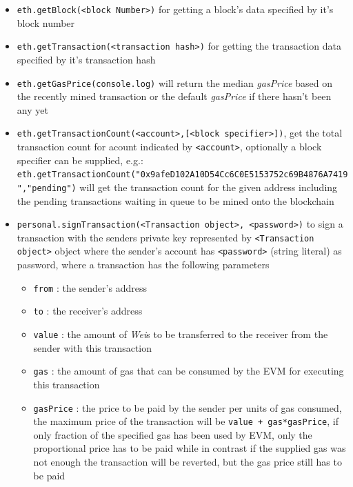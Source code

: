 \documentclass[a4paper]{article}
\begin{document}
\begin{itemize}
\item \verb!eth.getBlock(<block Number>)! for getting a block's data specified by it's block number

\item \verb!eth.getTransaction(<transaction hash>)! for getting the transaction data specified by it's transaction hash

\item \verb!eth.getGasPrice(console.log)! will return the median \emph{gasPrice} based on the recently mined transaction or the default \emph{gasPrice} if there hasn't been any yet

\item \verb!eth.getTransactionCount(<account>,[<block specifier>])!, get the total transaction count for acount indicated by \verb!<account>!, optionally a block specifier can be supplied, e.g.: \\ \verb!eth.getTransactionCount("0x9afeD102A10D54Cc6C0E5153752c69B4876A7419","pending")! will get the transaction count for the given address including the pending transactions waiting in queue to be mined onto the blockchain

\item \verb!personal.signTransaction(<Transaction object>, <password>)! to sign a transaction with the senders private key represented by \verb!<Transaction object>! object where the sender's account has \verb!<password>! (string literal) as password, where a transaction has the following parameters

\begin{itemize}

\item \verb!from! : the sender's address

\item \verb!to! : the receiver's address

\item \verb!value! : the amount of \emph{Wei}s to be transferred to the receiver from the sender with this transaction

\item \verb!gas! : the amount of gas that can be consumed by the EVM for executing this transaction

\item \verb!gasPrice! : the price to be paid by the sender per units of gas consumed, the maximum price of the transaction will be \verb!value + gas*gasPrice!, if only fraction of the specified gas has been used by EVM, only the proportional price has to be paid while in contrast if the supplied gas was not enough the transaction will be reverted, but the gas price still has to be paid


\end{itemize}
\end{itemize}
\end{document}
